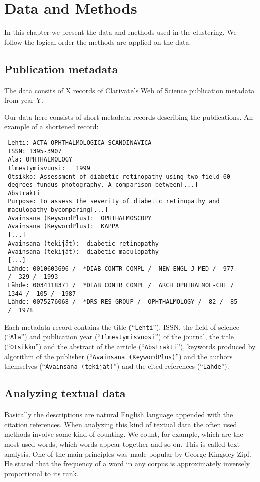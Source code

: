 \chapter{Data and Methods}
\label{chapter:methods}
In this chapter we present the data and methods used in the 
clustering. We follow the logical order the methods are applied on 
the data.

\section{Publication metadata}
\label{section:metadata}
The data consits of X records of Clarivate's Web of Science 
publication metadata from year Y.

Our data here consists of short metadata records describing the 
publications. An example of a shortened record:
\begin{verbatim}
 Lehti: ACTA OPHTHALMOLOGICA SCANDINAVICA
 ISSN: 1395-3907
 Ala: OPHTHALMOLOGY
 Ilmestymisvuosi:   1999
 Otsikko: Assessment of diabetic retinopathy using two-field 60 
 degrees fundus photography. A comparison between[...]
 Abstrakti
 Purpose: To assess the severity of diabetic retinopathy and 
 maculopathy bycomparing[...]
 Avainsana (KeywordPlus):  OPHTHALMOSCOPY
 Avainsana (KeywordPlus):  KAPPA
 [...]
 Avainsana (tekijät):  diabetic retinopathy
 Avainsana (tekijät):  diabetic maculopathy
 [...]
 Lähde: 0010603696 /  *DIAB CONTR COMPL /  NEW ENGL J MED /  977 
 /  329 /  1993
 Lähde: 0034118371 /  *DIAB CONTR COMPL /  ARCH OPHTHALMOL-CHI /  
 1344 /  105 /  1987
 Lähde: 0075276068 /  *DRS RES GROUP /  OPHTHALMOLOGY /  82 /  85 
 /  1978
 \end{verbatim}
 
Each metadata record contains the title (``\texttt{Lehti}''), 
ISSN, the field of science (``\texttt{Ala}'') and publication 
year (``\texttt{Ilmestymisvuosi}'') of the journal, the title 
(``\texttt{Otsikko}'') and the abstract of the article 
(``\texttt{Abstrakti}''), keywords produced by algorithm 
of the publisher (``\texttt{Avainsana (KeywordPlus)}'') and the 
authors themselves (``\texttt{Avainsana (tekijät)}'') and the 
cited references (``\texttt{Lähde}'').


 
\section{Analyzing textual data}
Basically the descriptions are natural English 
language appended with the citation references. When analyzing 
this kind of textual data the often used methods involve some 
kind of counting. We count, for example, which
are the most used words, which words appear together and so on.
This is called text analysis. One of the main principles was made 
popular by George Kingsley Zipf. He stated that the frequency of 
a word in any corpus is approximately inversely proportional to 
its rank. 

